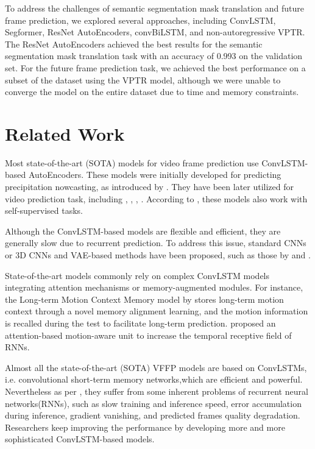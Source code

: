\documentclass{article}
\begin{document}
To address the challenges of semantic segmentation mask translation and future frame prediction, 
we explored several approaches, including ConvLSTM, Segformer, ResNet AutoEncoders, convBiLSTM, 
and non-autoregressive VPTR. The ResNet AutoEncoders achieved the best results for the semantic 
segmentation mask translation task with an accuracy of 0.993 on the validation set. For the 
future frame prediction task, we achieved the best performance on a subset of the dataset using 
the VPTR model, although we were unable to converge the model on the entire dataset due to 
time and memory constraints.

\section{Related Work}
Most state-of-the-art (SOTA) models for video frame prediction use ConvLSTM-based AutoEncoders. 
These models were initially developed for predicting precipitation nowcasting, as introduced by 
\citet{Shi2015ConvolutionalLN}. They have been later utilized for video prediction task, including 
\citet{Finn2016UnsupervisedLF}, \citet{Lotter2016DeepPC}, \citet{Xu2016EndtoEndLO}, 
\citet{Ballas2015DelvingDI}. According to \citet{Jing2019SelfSupervisedVF}, these models also 
work with self-supervised tasks.

Although the ConvLSTM-based models are flexible and efficient, they are generally slow due to 
recurrent prediction. To address this issue, standard CNNs or 3D CNNs and VAE-based methods 
have been proposed, such as those by \citet{Mathieu2015DeepMV} and 
\citet{Babaeizadeh2017StochasticVV}.

State-of-the-art models commonly rely on complex ConvLSTM models integrating attention mechanisms 
or memory-augmented modules. For instance, the Long-term Motion Context Memory model by 
\citet{Lee2021VideoPR} stores long-term motion context through a novel memory alignment learning, 
and the motion information is recalled during the test to facilitate long-term prediction. 
\citet{Chang2021MAUAM} proposed an attention-based motion-aware unit to increase the temporal 
receptive field of RNNs.

Almost all the state-of-the-art (SOTA) VFFP models are based on ConvLSTMs, i.e. convolutional 
short-term memory networks,which are efficient and powerful. Nevertheless as per \citet{Ye2022VPTRET}, 
they suffer from some inherent problems of recurrent neural networks(RNNs), such as slow training 
and inference speed, error accumulation during inference, gradient vanishing, and predicted 
frames quality degradation. Researchers keep improving the performance by developing more and 
more sophisticated ConvLSTM-based models. 
\end{document}
